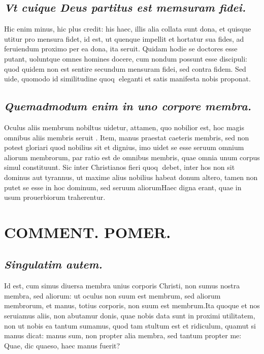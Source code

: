 \documentclass{article}
\begin{document}
\begin{pages}
\subsection*{\textit{Vt cuique Deus partitus est memsuram fidei. }}\pstart Hic enim minus, hic plus credit: his haec, illis alia collata sunt dona, et quisque utitur pro mensura fidet, id est, ut quenque impellit et hortatur sua fides, ad feruiendum proximo per ea dona, ita seruit. Quidam hodie se doctores esse putant, uoluntque omnes homines docere, cum nondum possunt esse discipuli: quod quidem non est sentire secundum mensuram fidei, sed contra fidem. Sed uide, quomodo id similitudine quoq eleganti et satis manifesta nobis proponat.   \pend
{}
{}
\subsection*{\textit{ Quemadmodum enim in uno corpore membra. }}\pstart Oculus aliis membrum nobiltus uidetur, attamen, quo nobilior est, hoc magis omnibus aliis membris seruit . Item, manus praestat caeteris membris, sed non potest gloriari quod nobilius sit et dignius, imo uidet se esse seruum omnium aliorum membrorum, par ratio est de omnibus membris, quae omnia unum corpus simul constituunt. Sic inter Christianos fieri quoq debet, inter hos non sit dominus aut tyrannus, ut maxime alius nobilius habeat donum altero, tamen non putet se esse in hoc dominum, sed seruum aliorumHaec digna erant, quae in usum prouerbiorum traherentur.   \pend
\section*{COMMENT. POMER.  }
{}
\subsection*{\textit{Singulatim autem. }}\pstart Id est, cum simus diuersa membra unius corporis Christi, non sumus nostra membra, sed aliorum: ut oculus non suum est membrum, sed aliorum membrorum, et manus, totius corporis, non suum est membrum.Ita quoque et nos seruiamus aliis, non abutamur donis, quae nobis data sunt in proximi utilitatem, non ut nobis ea tantum sumamus, quod tam stultum est et ridiculum, quamut si manus dicat: manus sum, non propter alia membra, sed tantum propter me: Quae, dic quaeso, haec manus fuerit?  \pend
{}
{}

\end{pages}
\end{document}
